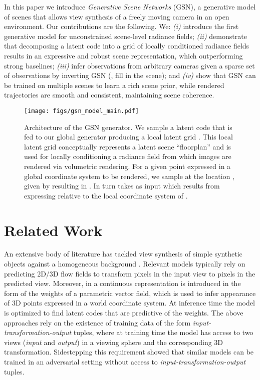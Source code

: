 \documentclass[10pt,twocolumn,letterpaper]{article}
\begin{document}
In this paper we introduce \textit{Generative Scene Networks} (GSN), a generative model of scenes that allows view synthesis of a freely moving camera in an open environment. Our contributions are the following. We: \textit{(i)} introduce the first generative model for unconstrained scene-level radiance fields; \textit{(ii)} demonstrate that decomposing a latent code into a grid of locally conditioned radiance fields results in an expressive and robust scene representation, which outperforming strong baselines; \textit{(iii)} infer observations from arbitrary cameras given a sparse set of observations by inverting GSN (\ie, fill in the scene); and \textit{(iv)} show that GSN can be trained on multiple scenes to learn a rich scene prior, while rendered trajectories are smooth and consistent, maintaining scene coherence.

\begin{figure*}[t]
    \centering
    \texttt{[image: figs/gsn\_model\_main.pdf]}
    \caption{Architecture of the GSN generator. We sample a latent code  that is fed to our global generator  producing a local latent grid . This local latent grid  conceptually represents a latent scene ``floorplan'' and is used for locally conditioning a radiance field  from which images are rendered via volumetric rendering. For a given point  expressed in a global coordinate system to be rendered, we sample  at the location , given by  resulting in . In turn  takes as input  which results from expressing  relative to the local coordinate system of .}
    \label{fig:gsn_model}
\end{figure*}

\section{Related Work}

An extensive body of literature has tackled view synthesis of simple synthetic objects \cite{shapenet} against a homogeneous background \cite{enr,tbn,gaf,multiview2novelview,appearanceflow}. Relevant models typically rely on predicting 2D/3D flow fields to transform pixels in the input view to pixels in the predicted view. Moreover, in \cite{srn} a continuous representation is introduced in the form of the weights of a parametric vector field, which is used to infer appearance of 3D points expressed in a world coordinate system. At inference time the model is optimized to find latent codes that are predictive of the weights. The above approaches rely on the existence of training data of the form \textit{input-transformation-output} tuples, where at training time the model has access to two views (\textit{input} and \textit{output}) in a viewing sphere and the corresponding 3D transformation. Sidestepping this requirement \cite{platonicgan,hologan} showed that similar models can be trained in an adversarial setting without access to \textit{input-transformation-output} tuples.
\end{document}
